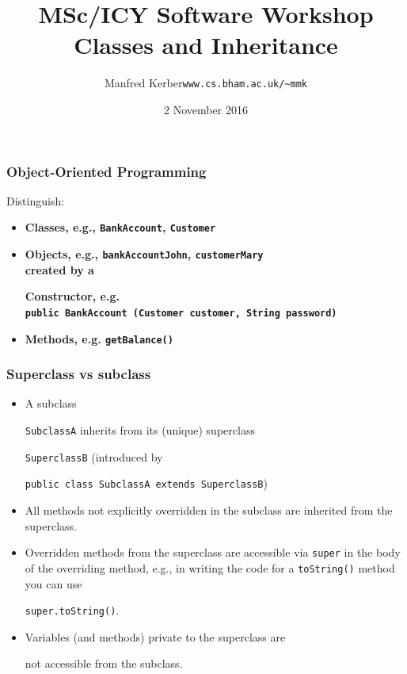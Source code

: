 \documentclass{beamer}
\def\mytoday{2 November 2016}
\def\mcolor#1#2{\rule{0ex}{0ex}\color{#1}#2\color{black}{}}
\begin{document}
\title{MSc/ICY Software Workshop\\
Classes and Inheritance}

\author[Manfred~Kerber]{\begin{tabular}{ll}
\mcolor{blue}{Manfred Kerber} &   {\tt www.cs.bham.ac.uk/\~{}mmk}\\
\end{tabular}}

\date{\mytoday}

\begin{frame}
\titlepage
\end{frame}

\begin{frame}
\frametitle{Object-Oriented Programming}
Distinguish:

\begin{itemize}
\item \mcolor{blue}{\bf Classes}, e.g., \texttt{BankAccount}, \texttt{Customer}
\item \mcolor{blue}{\bf Objects}, e.g., \texttt{bankAccountJohn}, \texttt{customerMary}\\
 created by a \mcolor{blue}{\bf Constructor}, e.g.\\
    \texttt{public BankAccount (Customer customer, String password)}
\item \mcolor{blue}{\bf Methods}, e.g.  \texttt{getBalance()}
\end{itemize}
\end{frame}


\begin{frame}
\frametitle{Superclass vs subclass}

\begin{itemize}
\item A subclass \mcolor{blue}{\texttt{SubclassA}} inherits from its (unique)
  superclass \mcolor{blue}{\texttt{SuperclassB}} (introduced by
  \mcolor{blue}{\texttt{public class SubclassA extends SuperclassB}})

\item All methods not explicitly overridden in the subclass are inherited from the superclass.

\item Overridden methods from the superclass are accessible via
  \texttt{super} in the body of the overriding method, e.g., in
  writing the code for a \texttt{toString()} method you can use
  \mcolor{blue}{\texttt{super.toString()}}.

\item Variables (and methods) private to the superclass are
  \mcolor{blue}{not accessible} from the subclass.
\end{itemize}
\end{frame}
\end{document}
